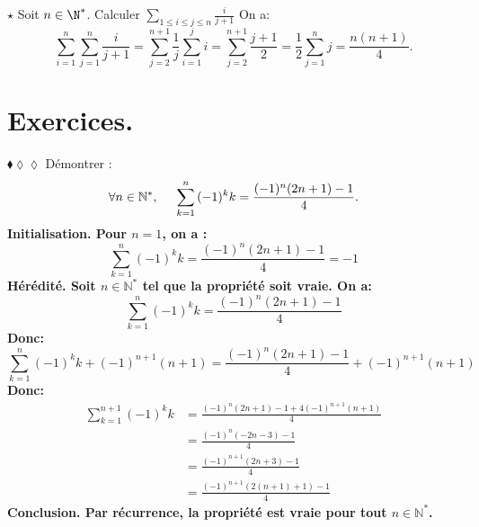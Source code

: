 \documentclass[11pt]{article}
\begin{document}
\begin{ex}{$\star$}{}
    Soit $n\in\N^*$. Calculer $\sum\limits_{1\leq i\leq j\leq n}\frac{i}{j+1}$
    \tcblower
    On a:
    \begin{equation*}
        \sum_{i=1}^n\sum_{j=1}^n\frac{i}{j+1}=\sum_{j=2}^{n+1}\frac{1}{j}\sum_{i=1}^ji=\sum_{j=2}^{n+1}\frac{j+1}{2}=\frac{1}{2}\sum_{j=1}^nj=\frac{n(n+1)}{4}.
    \end{equation*}
\end{ex}

\section{Exercices.}

\begin{exercice}{$\blacklozenge\lozenge\lozenge$}{}
    Démontrer :
    \begin{equation*}
        \forall{n}\in\mathbb{N}^*,\hspace{0.5cm} \sum\limits^{n}_{k=1}{(-1)^kk} = \frac{(-1)^n(2n+1)-1}{4}.
    \end{equation*}
    \tcblower
    \bf{Initialisation.} Pour $n=1$, on a :
    \begin{equation*}
        \sum\limits^{n}_{k=1}{(-1)^kk} = \frac{(-1)^n(2n+1)-1}{4} = -1
    \end{equation*}
    \bf{Hérédité.} Soit $n\in\mathbb{N}^*$ tel que la propriété soit vraie. On a:
    \begin{equation*}
        \sum\limits^{n}_{k=1}{(-1)^kk} = \frac{(-1)^n(2n+1)-1}{4}
    \end{equation*}
    Donc:
    \begin{equation*}
        \sum\limits^{n}_{k=1}{(-1)^kk} + (-1)^{n+1}(n+1) = \frac{(-1)^n(2n+1)-1}{4} +(-1)^{n+1}(n+1)
    \end{equation*}
    Donc:
    \begin{equation*}
        \begin{aligned}
            \sum\limits^{n+1}_{k=1}(-1)^kk 
            &= \frac{(-1)^n(2n+1)-1+4(-1)^{n+1}(n+1)}{4}\\
            &=\frac{(-1)^n(-2n - 3)-1}{4}\\
            &=\frac{(-1)^{n+1}(2n+3)-1}{4}\\
            &=\frac{(-1)^{n+1}(2(n+1)+1)-1}{4}
        \end{aligned}
    \end{equation*}
    \bf{Conclusion.} Par récurrence, la propriété est vraie pour tout $n\in\mathbb{N}^*$.
\end{exercice}
\end{document}
